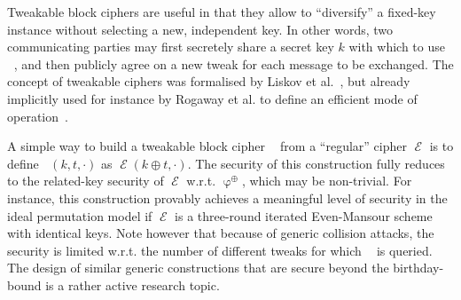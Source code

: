 \documentclass[11pt,a4paper]{article}
\theoremstyle{definition}
\DeclareMathOperator\E{\mathcal{E}}
\DeclareMathOperator\TE{\mathcal{\widetilde{E}}}
\DeclareMathOperator\rkf{\varphi}
\begin{document}
Tweakable block ciphers are useful in that they allow to ``diversify'' a fixed-key instance without selecting a new, independent key.
In other words, two communicating parties may first secretely share a secret key $k$ with which to use $\TE$, and then publicly agree on
a new tweak for each message to be exchanged. 
The concept of tweakable ciphers was formalised by Liskov et al.~\cite{DBLP:journals/joc/LiskovRW11},
but already implicitly used for instance by Rogaway et al. to define an efficient
mode of operation~\cite{DBLP:conf/ccs/RogawayBBK01}.

A simple way to build a tweakable block cipher $\TE$ from a ``regular'' cipher $\E$ is to define $\TE(k,t,\cdot)$ as $\E(k \oplus t,\cdot)$.
The security of this construction  fully reduces to the related-key security of $\E$ w.r.t. $\rkf^\oplus$, which may be non-trivial. For
instance, this construction provably achieves a meaningful level of security in the ideal permutation model if $\E$ is a three-round
iterated Even-Mansour scheme with identical keys. Note however that because of generic collision attacks, the security
is limited w.r.t. the number of different tweaks for which $\TE$ is queried. The design of similar generic constructions that are
secure beyond the birthday-bound is a rather active research topic. 



 
\end{document}
